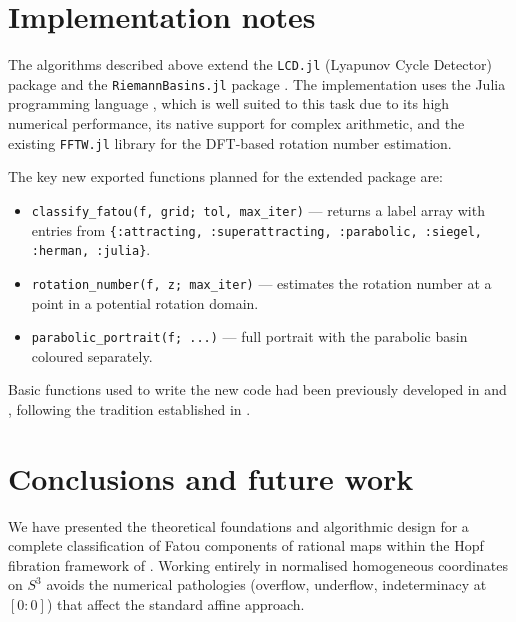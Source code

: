 \documentclass[12pt]{article}
\theoremstyle{definition}
\begin{document}
\section{Implementation notes}
\label{sec:implementation}

The algorithms described above extend the \texttt{LCD.jl}
(Lyapunov Cycle Detector) package \cite{LCD2022} and the
\texttt{RiemannBasins.jl} package \cite{RiemannBasins}.  The
implementation uses the Julia programming language \cite{Julia2017},
which is well suited to this task due to its high numerical performance,
its native support for complex arithmetic, and the existing
\texttt{FFTW.jl} library for the DFT-based rotation number estimation.

The key new exported functions planned for the extended package are:
\begin{itemize}
  \item \texttt{classify\_fatou(f, grid; tol, max\_iter)} --- returns a
        label array with entries from
        \texttt{\{:attracting, :superattracting, :parabolic, :siegel,
        :herman, :julia\}}.
  \item \texttt{rotation\_number(f, z; max\_iter)} --- estimates the
        rotation number at a point in a potential rotation domain.
  \item \texttt{parabolic\_portrait(f; ...)} --- full portrait with the
        parabolic basin coloured separately.
\end{itemize}

Basic functions used to write the new code had been previously developed
in \cite{Extremiana2019} and \cite{PBURF2019}, following the tradition
established in \cite{HernandezParicio2012}.

\section{Conclusions and future work}
\label{sec:conclusions}

We have presented the theoretical foundations and algorithmic design for
a complete classification of Fatou components of rational maps within the
Hopf fibration framework of \cite{Alvarez2023}.  Working entirely in
normalised homogeneous coordinates on $S^3$ avoids the numerical
pathologies (overflow, underflow, indeterminacy at $[0:0]$) that affect
the standard affine approach.
\end{document}
